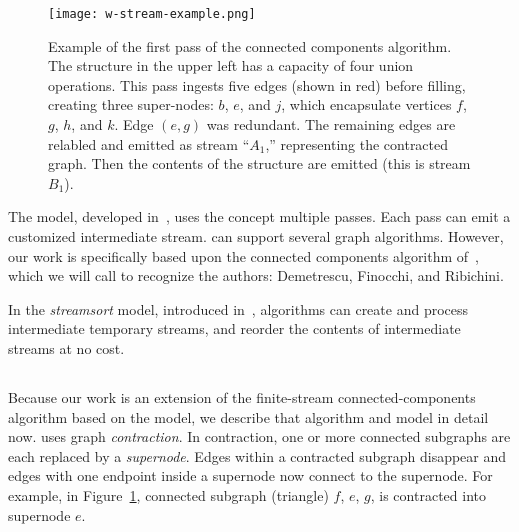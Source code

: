 
\begin{figure}[htb]
\begin{center}
\texttt{[image: w-stream-example.png]} \\
\end{center}
\caption{\label{fig:wstream-example} Example of the first pass of the  \DFR 
connected components algorithm.
The \uf structure in the upper left has a capacity of four union
operations. This pass ingests five edges (shown in red) 
before filling, creating three super-nodes: $b$, $e$, and $j$,
which encapsulate vertices $f$, $g$, $h$, and $k$.
Edge $(e,g)$ was redundant. The remaining edges are relabled and
emitted as stream ``$A_1$,'' representing the contracted graph.
Then the contents of the \uf structure are emitted
(this is stream $B_1$).}
\end{figure}

The \emph{\WStreamns} model, developed in~\cite{AMP:demetrescu2009trading},
uses the concept multiple passes. Each pass can emit a customized
intermediate stream. \WStream can support several graph algorithms. However,
our work is specifically based upon the connected components algorithm
of~\cite{AMP:demetrescu2009trading}, which we will call \emph{\DFR} to
recognize the authors: Demetrescu, Finocchi, and Ribichini.

In the \emph{streamsort} model, introduced in~\cite{AMP:aggarwal2004streaming}, algorithms can create and process intermediate temporary streams, and reorder the contents of intermediate streams at no cost.


\subsection{\WStreamns}\label{sec:intro:wstream}
Because our work is an extension of the \DFR finite-stream connected-components algorithm based on the \WStream model, we describe that algorithm and model in detail now.  \DFR uses graph {\em contraction}. In contraction, one or more connected subgraphs are each replaced by a {\em supernode}.  Edges within a contracted subgraph disappear and edges with one endpoint inside a supernode now connect to the supernode.  For example, in Figure~\ref{fig:wstream-example}, connected subgraph (triangle) $f$, $e$, $g$, is contracted into supernode $e$.

